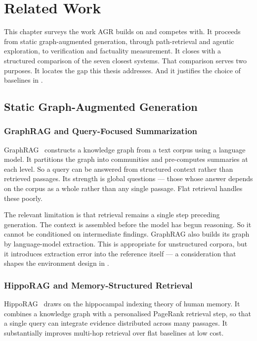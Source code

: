 \chapter{Related Work}\label{ch:related}

This chapter surveys the work AGR builds on and competes with. It proceeds from
static graph-augmented generation, through path-retrieval and agentic
exploration, to verification and factuality measurement. It closes with a
structured comparison of the seven closest systems. That comparison serves two
purposes. It locates the gap this thesis addresses. And it justifies the
choice of baselines in .

\section{Static Graph-Augmented Generation}\label{sec:static-graphrag}

\subsection{GraphRAG and Query-Focused Summarization}

GraphRAG~\cite{edge2024local} constructs a knowledge graph from a text
corpus using a language model. It partitions the graph into
communities and pre-computes summaries at each level. So a query can be
answered from structured context rather than retrieved passages. Its strength
is global questions --- those whose answer depends on the corpus as a whole
rather than any single passage. Flat retrieval handles these poorly.

The relevant limitation is that retrieval remains a single step preceding
generation. The context is assembled before the model has begun reasoning. So
it cannot be conditioned on intermediate findings. GraphRAG also builds its
graph by language-model extraction. This is appropriate for unstructured
corpora, but it introduces extraction error into the reference itself --- a
consideration that shapes the environment design in .

\subsection{HippoRAG and Memory-Structured Retrieval}

HippoRAG~\cite{gutierrez2024hipporag} draws on the hippocampal indexing theory
of human memory. It combines a knowledge graph with a personalised PageRank
retrieval step, so that a single query can integrate evidence distributed
across many passages. It substantially improves multi-hop retrieval over flat
baselines at low cost.

